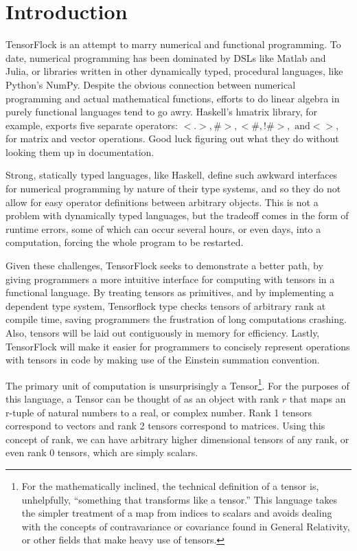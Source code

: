 \documentclass[12pt]{article}
\begin{document}
\maketitle

\section{Introduction}
TensorFlock is an attempt to marry numerical and functional programming.
%
To date, numerical programming has been dominated by DSLs like Matlab and
Julia, or libraries written in other dynamically typed, procedural languages,
like Python's NumPy. Despite the obvious connection between numerical
programming and actual mathematical functions, efforts to do linear algebra in
purely functional languages tend to go awry. Haskell's hmatrix library, for
example, exports five separate operators: $<.>, \#>, <\#, !\#>, \text{ and} <>$, for
matrix and vector operations. Good luck figuring out what they do without
looking them up in documentation.

Strong, statically typed languages, like Haskell, define such awkward interfaces for numerical programming by nature of their type systems, and so they do not allow for easy operator definitions between arbitrary objects. This is not a problem with
dynamically typed languages, but the tradeoff comes in the form of runtime
errors, some of which can occur several hours, or even days, into
a computation, forcing the whole program to be restarted.

Given these challenges, TensorFlock seeks to demonstrate a better path, by giving programmers a more intuitive interface for computing with tensors in a functional language. By treating tensors as primitives, and by implementing a dependent type system, Tensorflock type checks tensors of arbitrary rank at compile time, saving programmers the frustration of long computations crashing. Also, tensors will be laid out contiguously in memory for efficiency. Lastly, TensorFlock will make it easier for programmers to concisely represent operations with tensors in code by making use of the Einstein summation convention.

The primary unit of computation is unsurprisingly a Tensor\footnote{For the
mathematically inclined, the technical definition of a tensor is, unhelpfully,
``something that transforms like a tensor.'' This language takes the simpler
treatment of a map from indices to scalars and avoids dealing with the concepts
of contravariance or covariance found in General Relativity, or other fields
that make heavy use of tensors.}. 
For the purposes
of this language, a Tensor can be thought of as an object with rank $r$ that
maps an r-tuple of natural numbers to a real, or complex number. Rank 1 tensors
correspond to vectors and rank 2 tensors correspond to matrices. Using this
concept of rank, we can have arbitrary higher dimensional tensors of any rank,
or even rank 0 tensors, which are simply scalars.
\end{document}
